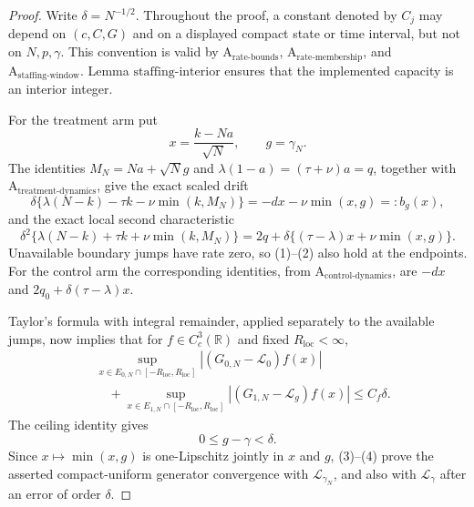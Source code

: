 \documentclass{article}
\begin{document}
\begin{proof}
Write \(\delta=N^{-1/2}\).  Throughout the proof, a constant denoted by \(C_j\) may depend on \((c,C,G)\) and on a displayed compact state or time interval, but not on \(N,p,\gamma\).  This convention is valid by \(\mathrm A_{\mathrm{rate\mbox{-}bounds}}\), \(\mathrm A_{\mathrm{rate\mbox{-}membership}}\), and \(\mathrm A_{\mathrm{staffing\mbox{-}window}}\).  Lemma \(\mathrm{staffing\mbox{-}interior}\) ensures that the implemented capacity is an interior integer.

For the treatment arm put
\[
 x=\frac{k-Na}{\sqrt N},\qquad g=\gamma_N.
\]
The identities \(M_N=Na+\sqrt N g\) and
\(\lambda(1-a)=(\tau+\nu)a=q\), together with \(\mathrm A_{\mathrm{treatment\mbox{-}dynamics}}\), give the exact scaled drift
\[
 \delta\{\lambda(N-k)-\tau k-\nu\min(k,M_N)\}
 =-dx-\nu\min(x,g)=:b_g(x),                                  \tag{1}
\]
and the exact local second characteristic
\[
 \delta^2\{\lambda(N-k)+\tau k+\nu\min(k,M_N)\}
 =2q+\delta\{(\tau-\lambda)x+\nu\min(x,g)\}.                 \tag{2}
\]
Unavailable boundary jumps have rate zero, so (1)--(2) also hold at the endpoints.  For the control arm the corresponding identities, from \(\mathrm A_{\mathrm{control\mbox{-}dynamics}}\), are \(-dx\) and \(2q_0+\delta(\tau-\lambda)x\).

Taylor's formula with integral remainder, applied separately to the available jumps, now implies that for \(f\in C_c^3(\mathbb R)\) and fixed \(R_{\mathrm{loc}}<\infty\),
\[
 \begin{split}
 &\sup_{x\in E_{0,N}\cap[-R_{\mathrm{loc}},R_{\mathrm{loc}}]}
   |(G_{0,N}-\mathcal L_0)f(x)|\\
 &\quad+
 \sup_{x\in E_{1,N}\cap[-R_{\mathrm{loc}},R_{\mathrm{loc}}]}
   |(G_{1,N}-\mathcal L_g)f(x)|
 \leq C_f\delta.                                               \tag{3}
 \end{split}
\]
The ceiling identity gives
\[
 0\leq g-\gamma<\delta.                                       \tag{4}
\]
Since \(x\mapsto\min(x,g)\) is one-Lipschitz jointly in \(x\) and \(g\), (3)--(4) prove the asserted compact-uniform generator convergence with \(\mathcal L_{\gamma_N}\), and also with \(\mathcal L_\gamma\) after an error of order \(\delta\).


\end{proof}
\end{document}
